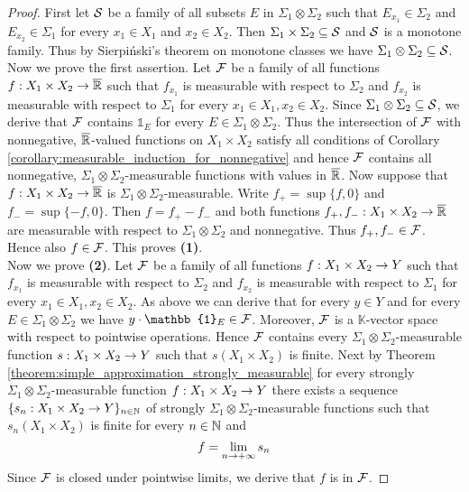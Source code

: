 \begin{proof}
First let ${\mathcal S}$ be a family of all subsets $E$ in $\Sigma_1\otimes \Sigma_2$ such that $E_{x_1}\in \Sigma_2$ and $E_{x_2}\in \Sigma_1$ for every $x_1\in X_1$ and $x_2\in X_2$. Then $\Sigma_1\times \Sigma_2\subseteq {\mathcal S}$ and ${\mathcal S}$ is a monotone family. Thus by Sierpiński's theorem on monotone classes we have $\Sigma_1\otimes \Sigma_2\subseteq {\mathcal S}$.\\
Now we prove the first assertion. Let ${\mathcal F}$ be a family of all functions $f:X_1\times X_2\rightarrow \overline{{\mathbb R}}$ such that $f_{x_1}$ is measurable with respect to $\Sigma_2$ and $f_{x_2}$ is measurable with respect to $\Sigma_1$ for every $x_1\in X_1,x_2\in X_2$. Since $\Sigma_1\otimes \Sigma_2\subseteq {\mathcal S}$, we derive that ${\mathcal F}$ contains $\mathbb{1}_E$ for every $E\in \Sigma_1\otimes \Sigma_2$. Thus the intersection of ${\mathcal F}$ with nonnegative, $\overline{{\mathbb R}}$-valued functions on $X_1\times X_2$ satisfy all conditions of Corollary \ref{corollary:measurable_induction_for_nonnegative} and hence ${\mathcal F}$ contains all nonnegative, $\Sigma_1\otimes \Sigma_2$-measurable functions with values in $\overline{{\mathbb R}}$. Now suppose that $f:X_1\times X_2\rightarrow \overline{{\mathbb R}}$ is $\Sigma_1\otimes \Sigma_2$-measurable. Write $f_+ = \sup\{f, 0\}$ and $f_- = \sup\{-f, 0\}$. Then $f = f_+ - f_-$ and both functions $f_+,f_-:X_1\times X_2\rightarrow \overline{{\mathbb R}}$ are measurable with respect to $\Sigma_1\otimes \Sigma_2$ and nonnegative. Thus $f_+,f_-\in {\mathcal F}$. Hence also $f\in {\mathcal F}$. This proves \textbf{(1)}.\\
Now we prove \textbf{(2)}. Let ${\mathcal F}$ be a family of all functions $f:X_1\times X_2\rightarrow Y$ such that $f_{x_1}$ is measurable with respect to $\Sigma_2$ and $f_{x_2}$ is measurable with respect to $\Sigma_1$ for every $x_1\in X_1,x_2\in X_2$. As above we can derive that for every $y\in Y$ and for every $E\in \Sigma_1\otimes \Sigma_2$ we have $y\cdot \mathbb{1}_E\in \cF$. Moreover, ${\mathcal F}$ is a $\mathbb{K}$-vector space with respect to pointwise operations. Hence ${\mathcal F}$ contains every $\Sigma_1\otimes \Sigma_2$-measurable function $s:X_1\times X_2\rightarrow Y$ such that $s(X_1\times X_2)$ is finite. Next by Theorem \ref{theorem:simple_approximation_strongly_measurable} for every strongly $\Sigma_1\otimes \Sigma_2$-measurable function $f:X_1\times X_2\rightarrow Y$ there exists a sequence $\{s_n:X_1\times X_2\rightarrow Y\}_{n\in {\mathbb N}}$ of strongly $\Sigma_1\otimes \Sigma_2$-measurable functions such that $s_n(X_1\times X_2)$ is finite for every $n\in {\mathbb N}$ and
$$f = \lim_{n\rightarrow +\infty}s_n$$
Since ${\mathcal F}$ is closed under pointwise limits, we derive that $f$ is in ${\mathcal F}$.
\end{proof}


